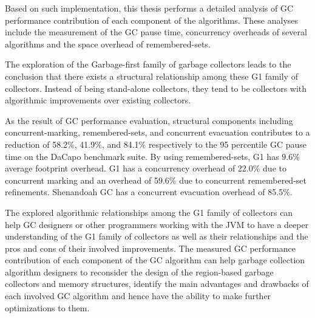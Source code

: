 Based on such implementation, this thesis performs a detailed
analysis of GC performance contribution of each component of the algorithms.
These analyses include the measurement of the GC pause time, concurrency overheads of several algorithms
and the space overhead of remembered-sets.


The exploration of the Garbage-first family of garbage collectors leads to the conclusion
that there exists a structural relationship among these G1 family of collectors.
Instead of being stand-alone collectors, they tend to be collectors with
algorithmic improvements over existing collectors.

As the result of GC performance evaluation,
structural components including concurrent-marking, remembered-sets, and concurrent
evacuation contributes to a reduction of 58.2\%, 41.9\%, and 84.1\%
respectively to the 95 percentile GC pause time on the DaCapo benchmark suite.
By using remembered-sets, G1 has 9.6\% average footprint overhead.
G1 has a concurrency overhead of 22.0\% due to concurrent marking and an overhead
of 59.6\% due to concurrent remembered-set refinements.
Shenandoah GC has a concurrent evacuation overhead of 85.5\%.


The explored algorithmic relationships among the G1 family of collectors can help
GC designers or other programmers working with the JVM to have a deeper understanding of
the G1 family of collectors as well as their relationships and the pros and cons of their involved improvements.
The measured GC performance contribution of each component of the GC algorithm
can help garbage collection algorithm designers to reconsider the design of 
the region-based garbage collectors and memory structures, identify
the main advantages and drawbacks of each involved GC algorithm and
hence have the ability to make further optimizations to them.

